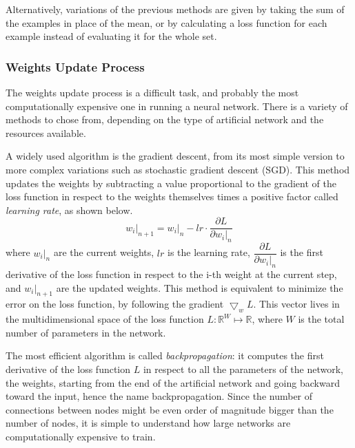 Alternatively, variations of the previous methods are given by taking the sum of the examples in place of the mean, or by calculating a loss function for each example instead of evaluating it for the whole set.

\subsubsection{Weights Update Process}
\label{sssec:Weights_Update_Process}

The weights update process is a difficult task, and probably the most computationally expensive one in running a neural network.
There is a variety of methods to chose from, depending on the type of artificial network and the resources available.

A widely used algorithm is the gradient descent, from its most simple version to more complex variations such as stochastic gradient descent (SGD).
This method updates the weights by subtracting a value proportional to the gradient of the loss function in respect to the weights themselves times a positive factor called \textit{learning rate}, as shown below.
\begin{equation}
	\left.w_i\right|_{n+1} = \left.w_i\right|_n - lr \cdot \frac{\partial L}{\partial \left.w_i\right|_n}
\end{equation}
where $\left.w_i\right|_{n}$ are the current weights, $lr$ is the learning rate, $\dfrac{\partial L}{\partial \left.w_i\right|_n}$ is the first derivative of the loss function in respect to the i-th weight at the current step, and $\left.w_i\right|_{n+1}$ are the updated weights.
This method is equivalent to minimize the error on the loss function, by following the gradient $\bigtriangledown_w L$.
This vector lives in the multidimensional space of the loss function $L:\mathbb{R}^W \mapsto \mathbb{R}$, where $W$ is the total number of parameters in the network.

The most efficient \cite{??} algorithm is called \textit{backpropagation}: it computes the first derivative of the loss function $L$ in respect to all the parameters of the network, the weights, starting from the end of the artificial network and going backward toward the input, hence the name backpropagation.
Since the number of connections between nodes might be even order of magnitude bigger than the number of nodes, it is simple to understand how large networks are computationally expensive to train.

